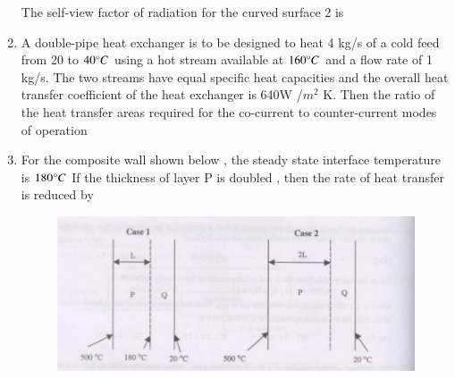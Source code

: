 \documentclass[journal,12pt,onecolumn]{IEEEtran}
\theoremstyle{remark}
\begin{document}
\begin{enumerate}
		The self-view factor of radiation for the curved surface 2 is 
		\begin{enumerate}
		\end{enumerate}
		
		\hfill \brak{\text{GATE CH 2009}}
		
		\item A double-pipe heat exchanger is to be designed to heat 4 kg/s of a cold feed from 20 to $40\degree C$ using a hot stream available at $160\degree C$ and a flow rate of 1 kg/s. The two streams have equal specific heat capacities and the overall heat transfer coefficient of the heat exchanger is 640W /$m^2$ K. Then the ratio of the heat transfer areas required for the co-current to counter-current modes of operation 
		\begin{enumerate}
			\begin{multicols}{2}
				\item 0.92
				\item 0.73
				\item 1.085
				\item 1.25
			\end{multicols}
		\end{enumerate}
		
		\hfill {}
		
		\item For the composite wall shown below , the steady state interface temperature is $180\degree C$ If the thickness of layer P is doubled , then the rate of heat transfer  is reduced by \\
		\begin{figure}[H]
			\centering
			\includegraphics[width = 0.7\columnwidth]{q35.png}
			\caption{}
			\label{fig:Q35}
		\end{figure}
		

\end{enumerate}
\end{document}
